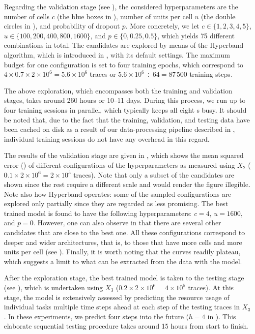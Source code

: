 Regarding the validation stage (see ), the considered
hyperparameters are the number of cells $c$ (the blue boxes in ),
number of units per cell $u$ (the double circles in ), and
probability of dropout $p$. More concretely, we let $c \in \{1, 2, 3, 4, 5\}$,
$u \in \{100, 200, 400, 800, 1600\}$, and $p \in \{0, 0.25, 0.5\}$, which yields
75 different combinations in total. The candidates are explored by means of the
Hyperband algorithm, which is introduced in , with its default
settings. The maximum budget for one configuration is set to four training
epochs, which correspond to $4 \times 0.7 \times 2 \times 10^6 = 5.6 \times
10^6$ traces or $5.6 \times 10^6 \div 64 = 87\,500$ training steps.

The above exploration, which encompasses both the training and validation
stages, takes around 260 hours or 10--11 days. During this process, we run up to
four training sessions in parallel, which typically keeps all eight s
busy. It should be noted that, due to the fact that the training, validation,
and testing data have been cached on disk as a result of our data-processing
pipeline described in , individual training sessions do not have any
overhead in this regard.


The results of the validation stage are given in , which shows
the mean squared error () of different configurations of the
hyperparameters as measured using $X_2$ ($0.1 \times 2 \times 10^6 = 2 \times
10^5$ traces). Note that only a subset of the candidates are shown since the
rest require a different scale and would render the figure illegible. Note also
how Hyperband operates: some of the sampled configurations are explored only
partially since they are regarded as less promising. The best trained model is
found to have the following hyperparameters: $c = 4$, $u = 1600$, and $p = 0$.
However, one can also observe in  that there are several other
candidates that are close to the best one. All these configurations correspond
to deeper and wider architectures, that is, to those that have more cells and
more units per cell (see ). Finally, it is worth noting that the
curves readily plateau, which suggests a limit to what can be extracted from the
data with the model.

After the exploration stage, the best trained model is taken to the testing
stage (see ), which is undertaken using $X_3$ ($0.2 \times 2
\times 10^6 = 4 \times 10^5$ traces). At this stage, the model is extensively
assessed by predicting the resource usage of individual tasks multiple time
steps ahead at each step of the testing traces in $X_3$. In these experiments,
we predict four steps into the future ($h = 4$ in ). This
elaborate sequential testing procedure takes around 15 hours from start to
finish.

